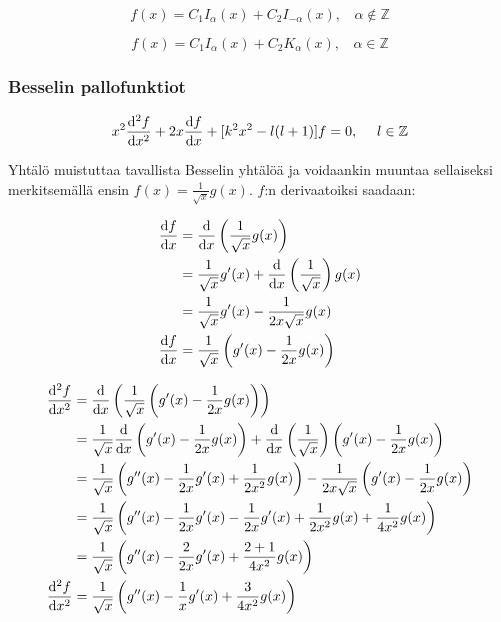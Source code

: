 \documentclass[../johdoksia.tex]{subfiles}
\begin{document}
	\begin{equation}
		\boxed{f(x) = C_1I_{\alpha}(x) + C_2I_{-\alpha}(x), \ \ \ \ \alpha\notin\mathbb{Z}}
	\end{equation}
	
	\begin{equation}
		\boxed{f(x) = C_1I_{\alpha}(x) + C_2K_{\alpha}(x), \ \ \ \ \alpha\in\mathbb{Z}}
	\end{equation}

	\subsubsection{Besselin pallofunktiot}
	
	\begin{equation}
		x^2\odv{^2f}{x^2} + 2x\odv{f}{x} + [k^2x^2 - l(l + 1)]f = 0, \ \ \ \ l \in \mathbb{Z}
	\end{equation}

	Yhtälö muistuttaa tavallista Besselin yhtälöä ja voidaankin muuntaa sellaiseksi merkitsemällä ensin $f(x) = \frac{1}{\sqrt{x}}g(x)$. $f$:n derivaatoiksi saadaan:
	
	\begin{align*}
		\odv{f}{x} &= \odv{}{x}\left(\frac{1}{\sqrt{x}}g(x)\right) \\
		&= \frac{1}{\sqrt{x}}g'(x) + \odv{}{x}\left(\frac{1}{\sqrt{x}}\right)g(x) \\
		&= \frac{1}{\sqrt{x}}g'(x) - \frac{1}{2x\sqrt{x}}g(x) \\
		\odv{f}{x} &= \frac{1}{\sqrt{x}}\left(g'(x) - \frac{1}{2x}g(x)\right)
	\end{align*}

	\begin{align*}
		\odv{^2f}{x^2} &= \odv{}{x}\left(\frac{1}{\sqrt{x}}\left(g'(x) - \frac{1}{2x}g(x)\right)\right) \\
		&= \frac{1}{\sqrt{x}}\odv{}{x}\left(g'(x) - \frac{1}{2x}g(x)\right) + \odv{}{x}\left(\frac{1}{\sqrt{x}}\right)\left(g'(x) - \frac{1}{2x}g(x)\right) \\
		&= \frac{1}{\sqrt{x}}\left(g''(x) - \frac{1}{2x}g'(x) + \frac{1}{2x^2}g(x)\right) - \frac{1}{2x\sqrt{x}}\left(g'(x) - \frac{1}{2x}g(x)\right) \\
		&= \frac{1}{\sqrt{x}}\left(g''(x) - \frac{1}{2x}g'(x) - \frac{1}{2x}g'(x) + \frac{1}{2x^2}g(x) + \frac{1}{4x^2}g(x)\right) \\
		&= \frac{1}{\sqrt{x}}\left(g''(x) - \frac{2}{2x}g'(x) + \frac{2 + 1}{4x^2}g(x)\right) \\
		\odv{^2f}{x^2} &= \frac{1}{\sqrt{x}}\left(g''(x) - \frac{1}{x}g'(x) + \frac{3}{4x^2}g(x)\right)
	\end{align*}
\end{document}
